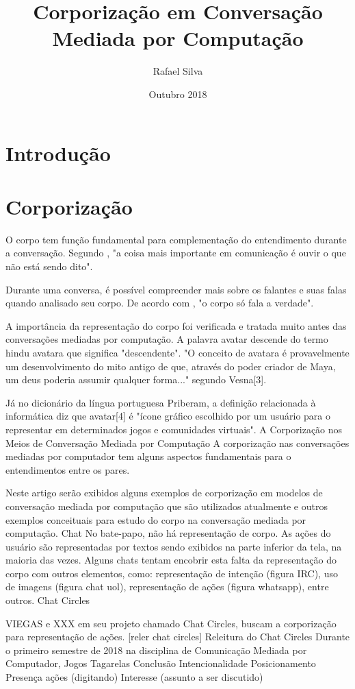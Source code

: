 \documentclass{article}
\title{Corporização em Conversação Mediada por Computação}
\author{Rafael Silva}
\date{Outubro 2018}
\begin{document}
\maketitle

\section{Introdução}



\section{Corporização}

O corpo tem função fundamental para complementação do entendimento durante a conversação. Segundo \cite{}, "a coisa mais importante em comunicação é ouvir o que não está sendo dito".

Durante uma conversa, é possível compreender mais sobre os falantes e suas falas quando analisado seu corpo. De acordo com \cite{Weil1986ONao-verbal}, "o corpo só fala a verdade".

A importância da representação do corpo foi verificada e tratada muito antes das conversações mediadas por computação. A palavra avatar descende do termo hindu avatara que significa "descendente". "O conceito de avatara é provavelmente um desenvolvimento do mito antigo de que, através do poder criador de Maya, um deus poderia assumir qualquer forma..." segundo Vesna[3].

Já no dicionário da língua portuguesa Priberam, a definição relacionada à informática diz que avatar[4] é "ícone gráfico escolhido por um usuário para o representar em determinados jogos e comunidades virtuais".
A Corporização nos Meios de Conversação Mediada por Computação
A corporização nas conversações mediadas por computador tem alguns aspectos fundamentais para o entendimentos entre os pares.

Neste artigo serão exibidos alguns exemplos de corporização em modelos de conversação mediada por computação que são utilizados atualmente e outros exemplos conceituais para estudo do corpo na conversação mediada por computação.
Chat
No bate-papo, não há representação de corpo. As ações do usuário são representadas por textos sendo exibidos na parte inferior da tela, na maioria das vezes. Alguns chats tentam encobrir esta falta da representação do corpo com outros elementos, como: representação de intenção (figura IRC), uso de imagens (figura chat uol), representação de ações (figura whatsapp), entre outros.
Chat Circles

VIEGAS e XXX em seu projeto chamado Chat Circles, buscam a corporização para representação de ações. [reler chat circles]
Releitura do Chat Circles
Durante o primeiro semestre de 2018 na disciplina de Comunicação Mediada por Computador, 
Jogos
Tagarelas
Conclusão
Intencionalidade
Posicionamento
Presença
ações (digitando)
Interesse (assunto a ser discutido)



\end{document}
